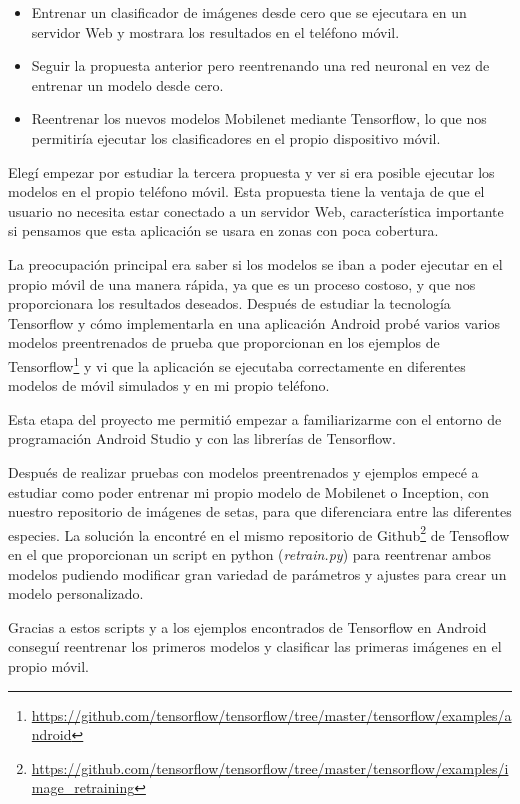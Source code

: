 \begin{itemize}
	\item Entrenar un clasificador de imágenes desde cero que se ejecutara en un servidor Web y mostrara los resultados en el teléfono móvil.
	\item Seguir la propuesta anterior pero reentrenando una red neuronal en vez de entrenar un modelo desde cero.
	\item Reentrenar los nuevos modelos Mobilenet mediante Tensorflow, lo que nos permitiría ejecutar los clasificadores en el propio dispositivo móvil.
\end{itemize}

Elegí empezar por estudiar la tercera propuesta y ver si era posible ejecutar los modelos en el propio teléfono móvil. Esta propuesta tiene la ventaja de que el usuario no necesita estar conectado a un servidor Web, característica importante si pensamos que esta aplicación se usara en zonas con poca cobertura.

La preocupación principal era saber si los modelos se iban a poder ejecutar en el propio móvil de una manera rápida, ya que es un proceso costoso, y que nos proporcionara los resultados deseados. Después de estudiar la tecnología Tensorflow y cómo implementarla en una aplicación Android probé varios varios modelos preentrenados de prueba que proporcionan en los ejemplos de Tensorflow\footnote{\url{https://github.com/tensorflow/tensorflow/tree/master/tensorflow/examples/android}} y vi que la aplicación se ejecutaba correctamente en diferentes modelos de móvil simulados y en mi propio teléfono.

Esta etapa del proyecto me permitió empezar a familiarizarme con el entorno de programación Android Studio y con las librerías de Tensorflow.

Después de realizar pruebas con modelos preentrenados y ejemplos empecé a estudiar como poder entrenar mi propio modelo de Mobilenet o Inception, con nuestro repositorio de imágenes de setas, para que diferenciara entre las diferentes especies. La solución la encontré en el mismo repositorio de Github\footnote{\url{https://github.com/tensorflow/tensorflow/tree/master/tensorflow/examples/image_retraining}} de Tensoflow en el que proporcionan un script en python (\textit{retrain.py}) para reentrenar ambos modelos pudiendo modificar gran variedad de parámetros y ajustes para crear un modelo personalizado.

Gracias a estos scripts y a los ejemplos encontrados de Tensorflow en Android conseguí reentrenar los primeros modelos y clasificar las primeras imágenes en el propio móvil.

